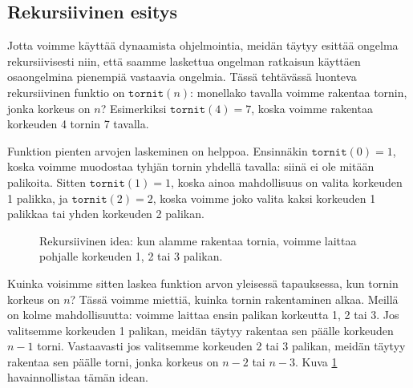 \subsection{Rekursiivinen esitys}

Jotta voimme käyttää dynaamista ohjelmointia,
meidän täytyy esittää ongelma rekursiivisesti
niin, että saamme laskettua ongelman ratkaisun
käyttäen osaongelmina pienempiä vastaavia ongelmia.
Tässä tehtävässä luonteva rekursiivinen funktio on
$\texttt{tornit}(n)$: monellako tavalla voimme
rakentaa tornin, jonka korkeus on $n$?
Esimerkiksi $\texttt{tornit}(4)=7$, koska
voimme rakentaa korkeuden 4 tornin 7 tavalla.

Funktion pienten arvojen laskeminen on helppoa.
Ensinnäkin $\texttt{tornit}(0)=1$, koska voimme
muodostaa tyhjän tornin yhdellä tavalla:
siinä ei ole mitään palikoita.
Sitten $\texttt{tornit}(1)=1$, koska ainoa mahdollisuus
on valita korkeuden 1 palikka,
ja $\texttt{tornit}(2)=2$, koska voimme joko valita
kaksi korkeuden 1 palikkaa tai yhden korkeuden 2 palikan.

\begin{figure}
\center
{}
\caption{Rekursiivinen idea: kun alamme rakentaa tornia, voimme laittaa pohjalle
korkeuden 1, 2 tai 3 palikan.}
\label{fig:dynrek}
\end{figure}


Kuinka voisimme sitten laskea funktion arvon yleisessä tapauksessa,
kun tornin korkeus on $n$?
Tässä voimme miettiä, kuinka tornin rakentaminen alkaa.
Meillä on kolme mahdollisuutta: voimme laittaa ensin palikan
korkeutta 1, 2 tai 3.
Jos valitsemme korkeuden 1 palikan, meidän täytyy rakentaa
sen päälle korkeuden $n-1$ torni.
Vastaavasti jos valitsemme korkeuden 2 tai 3 palikan,
meidän täytyy rakentaa sen päälle torni,
jonka korkeus on $n-2$ tai $n-3$.
Kuva \ref{fig:dynrek} havainnollistaa tämän idean.

